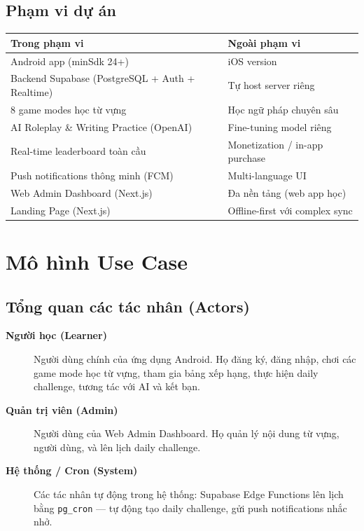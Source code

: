 \documentclass[12pt,a4paper]{article}
\begin{document}
\subsection{Phạm vi dự án}

\begin{tabular}{@{}lp{9cm}@{}}
\toprule
\textbf{Trong phạm vi} & \textbf{Ngoài phạm vi} \\
\midrule
Android app (minSdk 24+) & iOS version \\
Backend Supabase (PostgreSQL + Auth + Realtime) & Tự host server riêng \\
8 game modes học từ vựng & Học ngữ pháp chuyên sâu \\
AI Roleplay \& Writing Practice (OpenAI) & Fine-tuning model riêng \\
Real-time leaderboard toàn cầu & Monetization / in-app purchase \\
Push notifications thông minh (FCM) & Multi-language UI \\
Web Admin Dashboard (Next.js) & Đa nền tảng (web app học) \\
Landing Page (Next.js) & Offline-first với complex sync \\
\bottomrule
\end{tabular}

\section{Mô hình Use Case}
\label{sec:usecase}

\subsection{Tổng quan các tác nhân (Actors)}

\begin{description}
  \item[\textbf{Người học (Learner)}] Người dùng chính của ứng dụng Android.
        Họ đăng ký, đăng nhập, chơi các game mode học từ vựng, tham gia
        bảng xếp hạng, thực hiện daily challenge, tương tác với AI và kết bạn.

  \item[\textbf{Quản trị viên (Admin)}] Người dùng của Web Admin Dashboard.
        Họ quản lý nội dung từ vựng, người dùng, và lên lịch daily challenge.

  \item[\textbf{Hệ thống / Cron (System)}] Các tác nhân tự động trong hệ thống:
        Supabase Edge Functions lên lịch bằng \texttt{pg\_cron} — tự động tạo
        daily challenge, gửi push notifications nhắc nhở.
\end{description}
\end{document}
